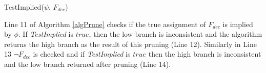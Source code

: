 \documentclass[twoside,11pt]{article}
\begin{document}
\incmargin{.5em}
\linesnumbered
\begin{algorithm}[t!]
\dontprintsemicolon
\BlankLine
{}
\caption{{\sc TestImplied}($\psi$, $F_{dec}$)  \label{algTestImplied}}
\end{algorithm}
\decmargin{.5em}


Line 11 of Algorithm \ref{algPrune} checks if the true assignment of $F_\mathit{dec}$ is implied by $\phi$. If   \emph{TestImplied} is $\mathit{true}$, then the low branch is inconsistent and the algorithm returns the high branch as the result of this pruning (Line 12). Similarly in Line 13 $\neg F_\mathit{dec}$ is checked and if \emph{TestImplied} is $\mathit{true}$ then the high branch is inconsistent and the low branch returned after pruning (Line 14). 
\end{document}
